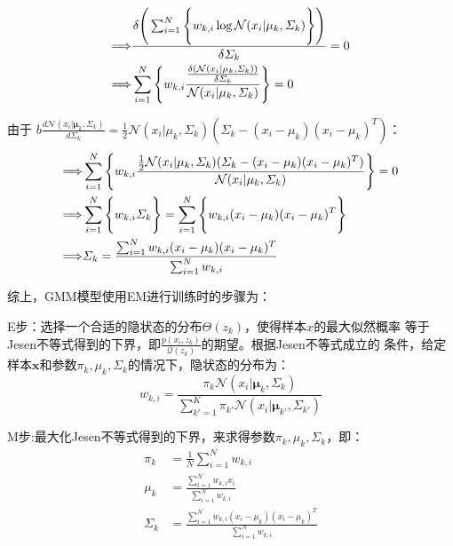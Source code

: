 \begin{displaymath}
\begin{split}
\Longrightarrow& \frac{
\delta{ \Bigg{(}
\sum_{i=1}^{N}
\Bigg{\{}
w_{k,i} \log{\mathcal{N}(x_{i}|\mu_k,\varSigma_k)} 
\Bigg{\}} \Bigg{)}
}}{\delta{\varSigma_k}} = 0 \\
\Longrightarrow &
\sum_{i=1}^{N}
\Bigg{\{}
w_{k,i} 
\frac{
      \frac{
           \delta(  \mathcal{N}(x_{i}|\mu_k,\varSigma_k)  )
           }{\delta{\varSigma_k}}
}
{\mathcal{N}(x_{i}|\mu_k,\varSigma_k)} 
\Bigg{\}}
 = 0\\
\end{split}
\end{displaymath}

由于 $b\frac{d
  \mathcal{N}(x_{i}|\mathbf{\mu}_k,\mathbf{\varSigma}_k)}{d\varSigma_k} =
 \frac{1}{2}\mathcal{N}(x_{i}|\mu_k,\varSigma_k)
(\varSigma_k - (x_i-\mu_k)(x_i-\mu_k)^T)$：
\begin{displaymath}
\begin{split}
\Longrightarrow& 
\sum_{i=1}^{N}
\Bigg{\{}
w_{k,i} 
\frac{
\frac{1}{2}\mathcal{N}(x_{i}|\mu_k,\varSigma_k)
(\varSigma_k - (x_i-\mu_k)(x_i-\mu_k)^T)
}
{\mathcal{N}(x_{i}|\mu_k,\varSigma_k)} 
\Bigg{\}}
 = 0\\
\Longrightarrow& 
\sum_{i=1}^{N}
\Bigg{\{}
w_{k,i}\varSigma_k
\Bigg{\}}
 = \sum_{i=1}^{N}
\Bigg{\{}
w_{k,i}(x_i-\mu_k)(x_i-\mu_k)^T
\Bigg{\}}
\\
\Longrightarrow& 
\varSigma_k = \frac{
\sum_{i=1}^{N}  w_{k,i} (x_i-\mu_k)(x_i-\mu_k)^T
}{ 
\sum_{i=1}^{N} w_{k,i}
}\\
\end{split}
\end{displaymath}

综上，GMM模型使用EM进行训练时的步骤为：

E步：选择一个合适的隐状态的分布$\Theta(z_k)$，使得样本$x$的最大似然概率
等于Jesen不等式得到的下界，即$\frac{p(x_i,z_k)} {\mathcal{Q}(z_k)}$的期望。根据Jesen不等式成立的
条件，给定样本$\mathbf{x}$和参数$\pi_k, \mu_k, \varSigma_k$的情况下，隐状态的分布为：
\begin{displaymath}
w_{k,i} = \frac{
\pi_k\mathcal{N}(x_{i}|\mathbf{\mu}_k,\mathbf{\varSigma}_k)
}{
\sum_{k'=1}^{K}\pi_{k'}\mathcal{N}(x_{i}|\mathbf{\mu}_{k'},\mathbf{\varSigma}_{k'})
}
\end{displaymath} 

M步:最大化Jesen不等式得到的下界，来求得参数$\pi_k, \mu_k, \varSigma_k$，即：
\begin{displaymath}
\begin{split}
\pi_k &= \frac{1}{N}\sum_{i=1}^{N}{w_{k,i}}\\
\mu_k &= \frac{
\sum_{i=1}^{N}  w_{k,i}x_i 
}{ 
\sum_{i=1}^{N} w_{k,i}
}\\
\varSigma_k &= \frac{
\sum_{i=1}^{N}  w_{k,i} (x_i-\mu_k)(x_i-\mu_k)^T
}{ 
\sum_{i=1}^{N} w_{k,i}
}\\
\end{split}
\end{displaymath} 

